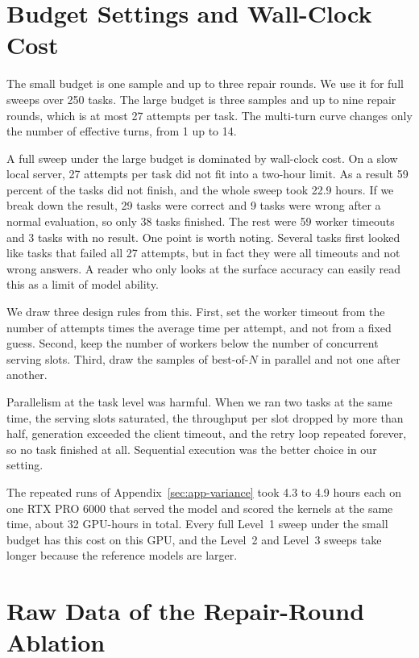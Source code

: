 \section{Budget Settings and Wall-Clock Cost}\label{sec:app-budget}

The small budget is one sample and up to three repair rounds. We use it for full sweeps over 250
tasks. The large budget is three samples and up to nine repair rounds, which is at most 27 attempts
per task. The multi-turn curve changes only the number of effective turns, from 1 up to 14.

A full sweep under the large budget is dominated by wall-clock cost. On a slow local server, 27
attempts per task did not fit into a two-hour limit. As a result 59 percent of the tasks did not
finish, and the whole sweep took 22.9 hours. If we break down the result, 29 tasks were correct and
9 tasks were wrong after a normal evaluation, so only 38 tasks finished. The rest were 59 worker
timeouts and 3 tasks with no result. One point is worth noting. Several tasks first looked like
tasks that failed all 27 attempts, but in fact they were all timeouts and not wrong answers. A
reader who only looks at the surface accuracy can easily read this as a limit of model ability.

We draw three design rules from this. First, set the worker timeout from the number of attempts
times the average time per attempt, and not from a fixed guess. Second, keep the number of workers
below the number of concurrent serving slots. Third, draw the samples of best-of-$N$ in parallel and
not one after another.

Parallelism at the task level was harmful. When we ran two tasks at the same time, the serving slots
saturated, the throughput per slot dropped by more than half, generation exceeded the client
timeout, and the retry loop repeated forever, so no task finished at all. Sequential execution was
the better choice in our setting.

The repeated runs of Appendix~\ref{sec:app-variance} took 4.3 to 4.9 hours each on one RTX PRO 6000
that served the model and scored the kernels at the same time, about 32 GPU-hours in total. Every
full Level~1 sweep under the small budget has this cost on this GPU, and the Level~2 and Level~3
sweeps take longer because the reference models are larger.

\section{Raw Data of the Repair-Round Ablation}

